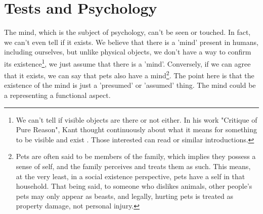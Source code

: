 \documentclass{ltjbook}
\begin{document}
\section{Tests and Psychology}
The mind, which is the subject of psychology, can't be seen or touched. In fact, we can't even tell if it exists. We believe that there is a 'mind' present in humans, including ourselves, but unlike physical objects, we don't have a way to confirm its existence\footnote{We can't tell if visible objects are there or not either. In his work "Critique of Pure Reason", Kant thought continuously about what it means for something to be visible and exist \parencite{Kant1961}. Those interested can read \textcite{Kurosaki2000} or similar introductions.}, we just assume that there is a 'mind'. Conversely, if we can agree that it exists, we can say that pets also have a mind\footnote{Pets are often said to be members of the family, which implies they possess a sense of self, and the family perceives and treats them as such. This means, at the very least, in a social existence perspective, pets have a self in that household. That being said, to someone who dislikes animals, other people's pets may only appear as beasts, and legally, hurting pets is treated as property damage, not personal injury.}. The point here is that the existence of the mind is just a 'presumed' or 'assumed' thing. The mind could be a  representing a functional aspect.
\end{document}
